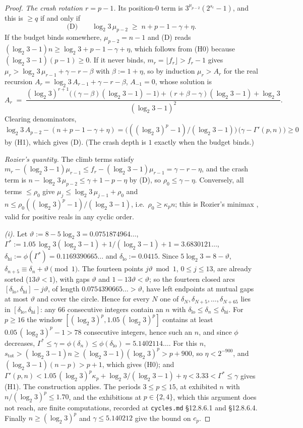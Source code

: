 \documentclass[11pt]{article}
\theoremstyle{remark}
\newcommand{\LL}{\log_2 3}
\newcommand{\kp}{\kappa_p}
\newcommand{\stot}{s_{\mathrm{tot}}}
\begin{document}
\begin{proof}
\emph{The crash rotation $r = p-1$.} Its position-$0$ term is $3^{\mu_{p-2}}(2^{s_c}-1)$, and this is $\ge q$ if and only if
\[ \text{(D)}\qquad \LL\, \mu_{p-2} \;\ge\; n + p - 1 - \gamma + \eta . \]
If the budget binds somewhere, $\mu_{p-2} = n-1$ and (D) reads $(\LL-1)n \ge \LL + p - 1 - \gamma + \eta$, which follows from (H0) because $(\LL - 1)(p-1) \ge 0$. If it never binds, $m_r = \lfloor f_r\rfloor > f_r - 1$ gives $\mu_r > \LL\,\mu_{r-1} + \gamma - r - \beta$ with $\beta := 1 + \eta$, so by induction $\mu_r > A_r$ for the real recursion $A_r = \LL\,A_{r-1} + \gamma - r - \beta$, $A_{-1} = 0$, whose solution is
\[ A_r \;=\; \frac{(\LL)^{r+1}\bigl((\gamma-\beta)(\LL-1) - 1\bigr) + (r + \beta - \gamma)(\LL-1) + \LL}{(\LL-1)^2}. \]
Clearing denominators, $\LL\,A_{p-2} - (n + p - 1 - \gamma + \eta) = \bigl(((\LL)^p - 1)/(\LL - 1)\bigr)\,\bigl(\gamma - \Gamma'(p,n)\bigr) \ge 0$ by (H1), which gives (D). (The crash depth is $1$ exactly when the budget binds.)

\emph{Rozier's quantity.} The climb terms satisfy $m_r - (\LL-1)\mu_{r-1} \le f_r - (\LL - 1)\mu_{r-1} = \gamma - r - \eta$, and the crash term is $n - \LL\,\mu_{p-2} \le \gamma + 1 - p - \eta$ by (D), so $\rho_0 \le \gamma - \eta$. Conversely, all terms $\le \rho_0$ give $\mu_j \le \LL\,\mu_{j-1} + \rho_0$ and $n \le \rho_0((\LL)^p - 1)/(\LL - 1)$, i.e.\ $\rho_0 \ge \kp n$; this is Rozier's minimax \cite[p.~11]{rozier91}, valid for positive reals in any cyclic order.

\emph{(i).} Let $\vartheta := 8 - 5\LL = 0.0751874964\ldots$, $\Gamma^\ast := 1.05\,\LL(\LL-1) + 1/(\LL-1) + 1 = 3.6830121\ldots$, $\delta_{\mathrm{hi}} := \phi(\Gamma^\ast) = 0.1169390665\ldots$ and $\delta_{\mathrm{lo}} := 0.0415$. Since $5\LL = 8 - \vartheta$, $\delta_{n+5} \equiv \delta_n + \vartheta \pmod 1$. The fourteen points $j\vartheta \bmod 1$, $0 \le j \le 13$, are already sorted ($13\vartheta < 1$), with gaps $\vartheta$ and $1 - 13\vartheta < \vartheta$; so the fourteen closed arcs $[\delta_{\mathrm{lo}}, \delta_{\mathrm{hi}}] - j\vartheta$, of length $0.0754390665\ldots > \vartheta$, have left endpoints at mutual gaps at most $\vartheta$ and cover the circle. Hence for every $N$ one of $\delta_N, \delta_{N+5}, \dots, \delta_{N+65}$ lies in $[\delta_{\mathrm{lo}}, \delta_{\mathrm{hi}}]$: any $66$ consecutive integers contain an $n$ with $\delta_{\mathrm{lo}} \le \delta_n \le \delta_{\mathrm{hi}}$. For $p \ge 16$ the window $[(\LL)^p, 1.05\,(\LL)^p]$ contains at least $0.05\,(\LL)^p - 1 > 78$ consecutive integers, hence such an $n$, and since $\phi$ decreases, $\Gamma^\ast \le \gamma = \phi(\delta_n) \le \phi(\delta_{\mathrm{lo}}) = 5.1402114\ldots$. For this $n$, $\stot > (\LL-1)n \ge (\LL-1)(\LL)^p > p + 900$, so $\eta < 2^{-900}$, and $(\LL-1)(n-p) > p + 1$, which gives (H0); and $\Gamma'(p,n) < 1.05\,(\LL)^p\kp + \LL/(\LL-1) + \eta < 3.33 < \Gamma^\ast \le \gamma$ gives (H1). The construction applies. The periods $3 \le p \le 15$, at exhibited $n$ with $n/(\LL)^p \le 1.70$, and the exhibitions at $p \in \{2, 4\}$, which this argument does not reach, are finite computations, recorded at \texttt{cycles.md} \S12.8.6.1 and \S12.8.6.4. Finally $n \ge (\LL)^p$ and $\gamma \le 5.140212$ give the bound on $c_p$.


\end{proof}
\end{document}
